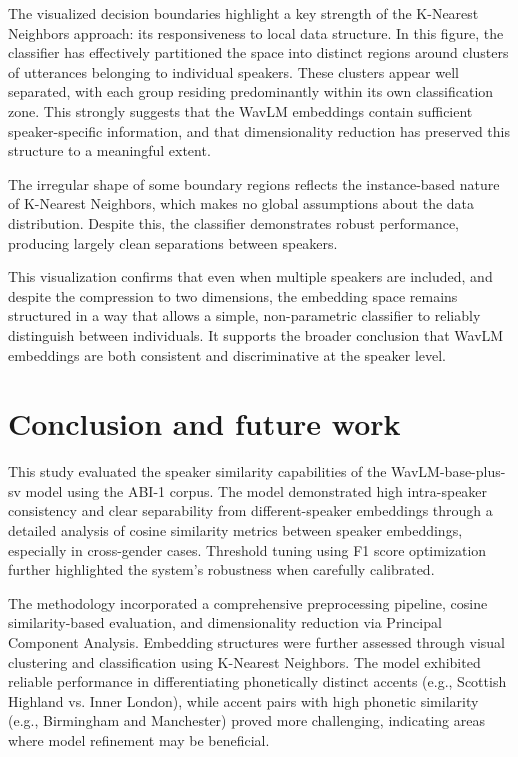 \documentclass[conference]{IEEEtran}
\begin{document}
The visualized decision boundaries highlight a key strength of the K-Nearest Neighbors approach: its responsiveness to local data structure. In this figure, the classifier has effectively partitioned the space into distinct regions around clusters of utterances belonging to individual speakers. These clusters appear well separated, with each group residing predominantly within its own classification zone. This strongly suggests that the WavLM embeddings contain sufficient speaker-specific information, and that dimensionality reduction has preserved this structure to a meaningful extent.

The irregular shape of some boundary regions reflects the instance-based nature of K-Nearest Neighbors, which makes no global assumptions about the data distribution. Despite this, the classifier demonstrates robust performance, producing largely clean separations between speakers.

This visualization confirms that even when multiple speakers are included, and despite the compression to two dimensions, the embedding space remains structured in a way that allows a simple, non-parametric classifier to reliably distinguish between individuals. It supports the broader conclusion that WavLM embeddings are both consistent and discriminative at the speaker level.



\section{Conclusion and future work}



This study evaluated the speaker similarity capabilities of the WavLM-base-plus-sv model using the ABI-1 corpus. The model demonstrated high intra-speaker consistency and clear separability from different-speaker embeddings through a detailed analysis of cosine similarity metrics between speaker embeddings, especially in cross-gender cases. Threshold tuning using F1 score optimization further highlighted the system’s robustness when carefully calibrated.

The methodology incorporated a comprehensive preprocessing pipeline, cosine similarity-based evaluation, and dimensionality reduction via Principal Component Analysis. Embedding structures were further assessed through visual clustering and classification using K-Nearest Neighbors. The model exhibited reliable performance in differentiating phonetically distinct accents (e.g., Scottish Highland vs. Inner London), while accent pairs with high phonetic similarity (e.g., Birmingham and Manchester) proved more challenging, indicating areas where model refinement may be beneficial.
\end{document}
